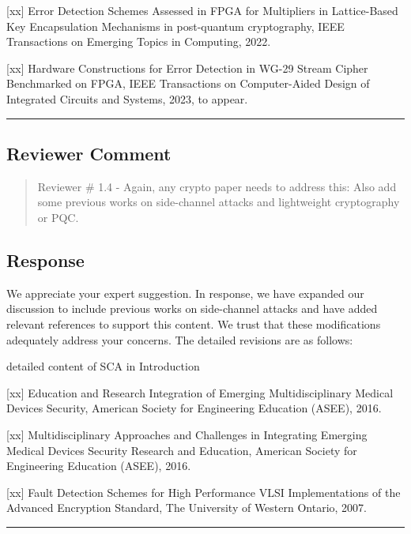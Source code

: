 	[xx] Error Detection Schemes Assessed in FPGA for Multipliers in Lattice-Based Key Encapsulation Mechanisms in post-quantum cryptography, IEEE Transactions on Emerging Topics in Computing, 2022.

	[xx] Hardware Constructions for Error Detection in WG-29 Stream Cipher Benchmarked on FPGA, IEEE Transactions on Computer-Aided Design of Integrated Circuits and Systems, 2023, to appear.

\color{black}

\noindent\rule{\linewidth}{2.0pt}

\subsection{Reviewer Comment}
\begin{mdframed}
	\begin{quote}
		Reviewer \# 1.4 - Again, any crypto paper needs to address this: Also add some previous works on side-channel attacks and lightweight cryptography or PQC.
	\end{quote}
\end{mdframed}

\subsection{Response}

We appreciate your expert suggestion. In response, we have expanded our discussion to include previous works on side-channel attacks and have added relevant references to support this content. We trust that these modifications adequately address your concerns. The detailed revisions are as follows:

\color{blue}
detailed content of SCA in Introduction

	[xx] Education and Research Integration of Emerging Multidisciplinary Medical Devices Security, American Society for Engineering Education (ASEE), 2016.

	[xx] Multidisciplinary Approaches and Challenges in Integrating Emerging Medical Devices Security Research and Education, American Society for Engineering Education (ASEE), 2016.

	[xx] Fault Detection Schemes for High Performance VLSI Implementations of the Advanced Encryption Standard, The University of Western Ontario, 2007.

\color{black}

\noindent\rule{\linewidth}{2.0pt}

